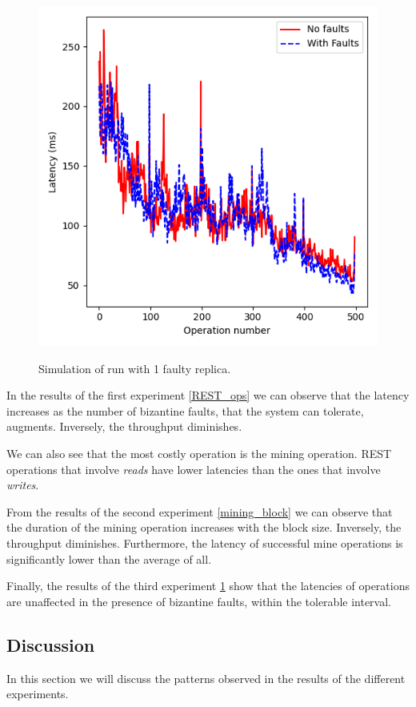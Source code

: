 \documentclass[10pt,journal,compsoc]{IEEEtran}
\begin{document}
	\begin{figure}[!ht]
		\includegraphics[width=\linewidth]{figures/Fault_Simulations.png}
		\label{Fault simulation}
		\caption{Simulation of run with 1 faulty replica.}
	\end{figure}
	
	In the results of the first experiment \ref{REST_ops} we can observe that the latency increases as the number of bizantine faults, that the system can tolerate, augments. Inversely, the throughput diminishes.

	We can also see that the most costly operation is the mining operation. REST operations that involve \textit{reads} have lower latencies than the ones that involve \textit{writes}.

	From the results of the second experiment \ref{mining_block} we can observe that the duration of the mining operation increases with the block size. Inversely, the throughput diminishes. Furthermore, the latency of successful mine operations is significantly lower than the average of all.

	Finally, the results of the third experiment \ref{Fault simulation} show that the latencies of operations are unaffected in the presence of bizantine faults, within the tolerable interval.
	

	\subsection{Discussion}
	In this section we will discuss the patterns observed in the results of the different experiments.
\end{document}
